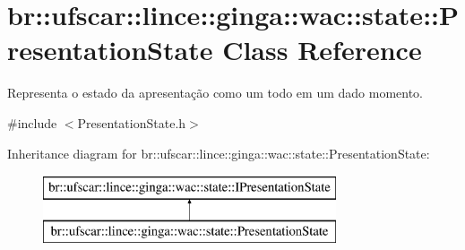 \hypertarget{classbr_1_1ufscar_1_1lince_1_1ginga_1_1wac_1_1state_1_1PresentationState}{
\section{br::ufscar::lince::ginga::wac::state::PresentationState Class Reference}
\label{classbr_1_1ufscar_1_1lince_1_1ginga_1_1wac_1_1state_1_1PresentationState}
}


Representa o estado da apresentação como um todo em um dado momento.  




{\ttfamily \#include $<$PresentationState.h$>$}

Inheritance diagram for br::ufscar::lince::ginga::wac::state::PresentationState:\begin{figure}[H]
\begin{center}
\leavevmode
\includegraphics[height=2cm]{classbr_1_1ufscar_1_1lince_1_1ginga_1_1wac_1_1state_1_1PresentationState}
\end{center}
\end{figure}
